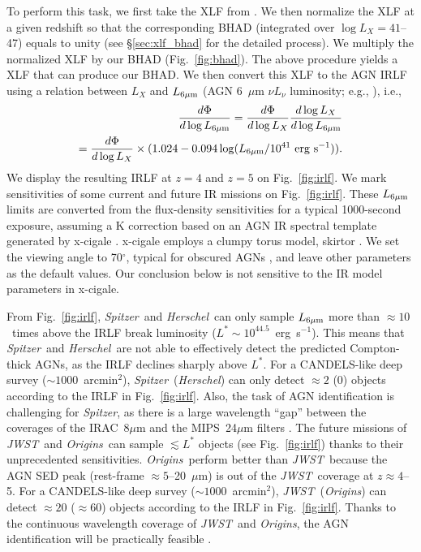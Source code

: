 \documentclass[twocolumn,twocolappendix,times]{aastex63}
\newcommand{\jwst}{{\it JWST\/}}
\newcommand{\origins}{{\it Origins\/}}
\newcommand{\spitzer}{{\it Spitzer\/}}
\newcommand{\herschel}{{\it Herschel\/}}
\newcommand{\lsix}{L_{\rm 6\mu m}}
\newcommand{\fst}[1]{#1}
\begin{document}
\begin{CJK*}{UTF8}{gbsn}
\fst{To perform this task, we first take the XLF from \cite{aird15}.
We then normalize the XLF at a given redshift so that the corresponding BHAD (integrated over $\log L_X = 41$--47) equals to unity (see \S\ref{sec:xlf_bhad} for the detailed process). 
We multiply the normalized XLF by our BHAD (Fig.~\ref{fig:bhad}). 
The above procedure yields a XLF that can produce our BHAD.
We then convert this XLF to the AGN IRLF using a relation between $L_X$ and $\lsix$ (AGN 6~$\mu$m $\nu L_\nu$ luminosity; e.g., \citealt{stern15}), i.e., 
\begin{equation}
\label{eq:irlf}
\begin{split}
\frac{d\Phi}{d\log \lsix} = \frac{d\Phi}{d\log L_X} \frac{d\log L_X}{d\log \lsix} \\
    = \frac{d\Phi}{d\log L_X} \times (1.024-0.094\log(\lsix/10^{41}\ {\rm erg\ s^{-1}}) ).
\end{split}
\end{equation}
We display the resulting IRLF at $z=4$ and $z=5$ on Fig.~\ref{fig:irlf}.
We mark sensitivities of some current and future IR missions on Fig.~\ref{fig:irlf}.
These $\lsix$ limits are converted from the flux-density sensitivities for a typical 1000-second exposure, assuming a K correction based on an AGN IR spectral template generated by {\sc x-cigale} \citep{boquien19, yang20}. 
{\sc x-cigale} employs a clumpy torus model, {\sc skirtor} \citep{stalevski12, stalevski16}. 
We set the viewing angle to 70$^\circ$, typical for obscured AGNs \citep{yang20}, and leave other parameters as the default values. 
Our conclusion below is not sensitive to the IR model parameters in {\sc x-cigale}.
}

\fst{From Fig.~\ref{fig:irlf}, \spitzer\ and \herschel\ can only sample $\lsix$ more than $\approx 10$~times above the IRLF break luminosity ($L^* \sim 10^{44.5}$~erg~s$^{-1}$).
This means that \spitzer\ and \herschel\ are not able to effectively detect the predicted Compton-thick AGNs, as the IRLF declines sharply above $L^*$.
For a CANDELS-like deep survey ($\sim 1000$~arcmin$^2$), \spitzer\ (\herschel) can only detect $\approx 2$ (0) objects according to the IRLF in Fig.~\ref{fig:irlf}. 
Also, the task of AGN identification is challenging for \spitzer, as there is a large wavelength ``gap'' between the coverages of the IRAC~8$\mu$m and the MIPS~24$\mu$m filters \citep[e.g.,][]{yang21}.
The future missions of \jwst\ and \origins\ can sample $\lesssim L^*$ objects (see Fig.~\ref{fig:irlf}) thanks to their unprecedented sensitivities.
\origins\ perform better than \jwst\ because the AGN SED peak (rest-frame $\approx 5$--20~$\mu$m) is out of the \jwst\ coverage at $z\approx 4$--5.
For a CANDELS-like deep survey ($\sim 1000$~arcmin$^2$), \jwst\ (\origins) can detect $\approx 20$ ($\approx 60$) objects according to the IRLF in Fig.~\ref{fig:irlf}.
Thanks to the continuous wavelength coverage of \jwst\ and \origins, the AGN identification will be practically feasible \citep[e.g.,][]{yang21}.
}


\end{CJK*}
\end{document}
